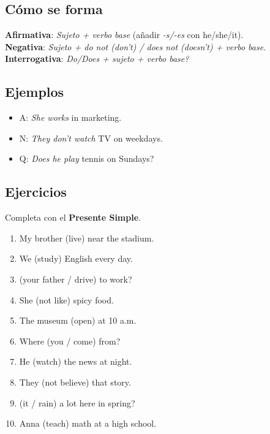 \documentclass[11pt,a4paper]{article}
\begin{document}
\subsection*{Cómo se forma}
\textbf{Afirmativa}: \emph{Sujeto + verbo base} (añadir \emph{-s/-es} con he/she/it).\\
\textbf{Negativa}: \emph{Sujeto + do not (don't) / does not (doesn't) + verbo base}.\\
\textbf{Interrogativa}: \emph{Do/Does + sujeto + verbo base?}

\subsection*{Ejemplos}
\begin{itemize}
  \item A: \emph{She works} in marketing.
  \item N: \emph{They don't watch} TV on weekdays.
  \item Q: \emph{Does he play} tennis on Sundays?
\end{itemize}

\subsection*{Ejercicios}
Completa con el \textbf{Presente Simple}.
\begin{enumerate}
  \item My brother \underline{\hspace{2.5cm}} (live) near the stadium.
  \item We \underline{\hspace{2.5cm}} (study) English every day.
  \item \underline{\hspace{2.5cm}} (your father / drive) to work?
  \item She \underline{\hspace{2.5cm}} (not like) spicy food.
  \item The museum \underline{\hspace{2.5cm}} (open) at 10 a.m.
  \item Where \underline{\hspace{2.5cm}} (you / come) from?
  \item He \underline{\hspace{2.5cm}} (watch) the news at night.
  \item They \underline{\hspace{2.5cm}} (not believe) that story.
  \item \underline{\hspace{2.5cm}} (it / rain) a lot here in spring?
  \item Anna \underline{\hspace{2.5cm}} (teach) math at a high school.
\end{enumerate}
\end{document}
